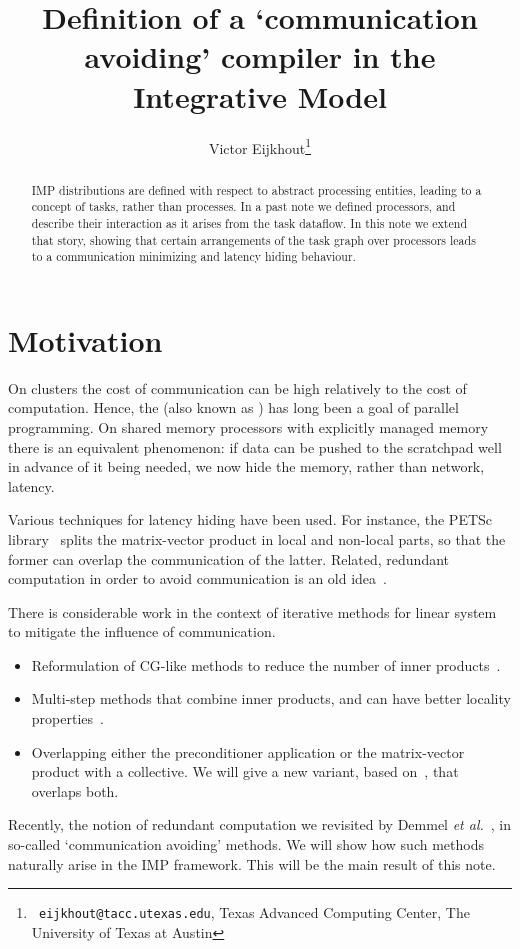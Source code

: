\documentclass[11pt,fleqn,preprint]{impreport}
\title[communication avoiding]{Definition of a `communication avoiding' compiler in the Integrative Model\construction}
\author[Eijkhout]{Victor Eijkhout\thanks{{\tt
      eijkhout@tacc.utexas.edu}, Texas Advanced Computing Center, The
    University of Texas at Austin}}
\begin{document}
\maketitle

\begin{abstract}
IMP distributions are defined with respect to abstract processing entities,
leading to a concept of tasks, rather than processes. In a past note
we defined processors, and describe their interaction
as it arises from the task dataflow. In this note we extend that story, 
showing that certain arrangements of the task graph over processors
leads to a communication minimizing and latency hiding behaviour.
\end{abstract}

\section{Motivation}

On clusters the cost of communication can be high relatively to
the cost of computation. Hence, the  (also known as ) has
long been a goal of parallel programming.
%
On shared memory processors
with explicitly managed  memory there is an
equivalent phenomenon: if data can be pushed to the scratchpad well in
advance of it being needed, we now hide the memory, rather than
network, latency.

Various techniques for latency hiding have been used. For instance,
the PETSc library~\cite{GrSm:petsc} splits the matrix-vector product
in local and non-local parts, so that the former can overlap the
communication of the latter.
%
Related, redundant computation in order to avoid communication is an
old idea~\cite{OpJo:improved-ssor}.

There is considerable work in the context of iterative methods for
linear system to mitigate the influence of communication.
\begin{itemize}
\item Reformulation of CG-like methods to reduce the number of inner
  products~\cite{ChGe:sstep,DAzEijRo:ppscicomp,Sa:practicalKrylov,Me:multicg}.
\item Multi-step methods that combine inner products, and can have
  better locality properties~\cite{ChGe:sstep}.
\item
  Overlapping either the preconditioner
  application or the matrix-vector product with a
  collective\cite{dehevo92:acta}. We will give a new variant, based
  on~\cite{Gropp:libraries}, that overlaps both.
\end{itemize}
Recently, the notion of redundant computation we revisited by Demmel
\emph{et al.}~\cite{Demmel2008IEEE:avoiding}, in so-called
`communication avoiding' methods. We will show how such methods
naturally arise in the IMP framework. This will be the main result of
this note.
\end{document}
